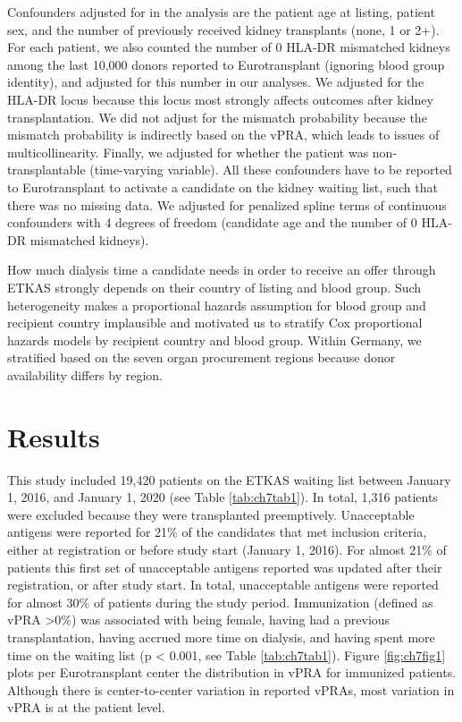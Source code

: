 \documentclass[11pt,twoside,]{book}
\begin{document}
Confounders adjusted for in the analysis are the patient age at listing, patient
sex, and the number of previously received kidney transplants (none, 1 or 2+). For each
patient, we also counted the number of 0 HLA-DR mismatched kidneys among
the last 10,000 donors reported to Eurotransplant (ignoring blood group identity),
and adjusted for this number in our analyses. We adjusted for the HLA-DR locus
because this locus most strongly affects outcomes after kidney transplantation.
We did not adjust for the mismatch probability because the mismatch probability
is indirectly based on the vPRA, which leads to issues of multicollinearity.
Finally, we adjusted for whether the patient
was non-transplantable (time-varying variable). All these confounders have to be
reported to Eurotransplant to activate a candidate on the kidney waiting list, such
that there was no missing data. We adjusted for penalized spline terms of
continuous confounders with 4 degrees of freedom (candidate age and the number of 0
HLA-DR mismatched kidneys).

How much dialysis time a candidate needs in order to receive an offer
through ETKAS strongly depends on their country of listing and
blood group. Such heterogeneity makes a proportional hazards assumption for
blood group and recipient country implausible and motivated us to stratify Cox
proportional hazards models by recipient country and blood group. Within Germany, we
stratified based on the seven organ procurement regions because donor availability
differs by region.
\newpage

\section{Results}\label{results-2}

This study included 19,420 patients on the ETKAS waiting list between
January 1, 2016, and January 1, 2020 (see Table \ref{tab:ch7tab1}). In total,
1,316 patients were excluded because they were transplanted preemptively.
Unacceptable antigens were reported for 21\% of the candidates that met inclusion
criteria, either at registration or before study start (January 1, 2016). For almost
21\% of patients this first set of unacceptable antigens reported was updated after
their registration, or after study start. In total, unacceptable antigens were
reported for almost 30\% of patients during the study period. Immunization
(defined as vPRA \textgreater0\%) was associated with being female, having had a previous
transplantation, having accrued more time on dialysis, and having spent more time on
the waiting list (p \textless{} 0.001, see Table \ref{tab:ch7tab1}).
Figure \ref{fig:ch7fig1} plots per Eurotransplant center
the distribution in vPRA for immunized patients. Although there is
center-to-center variation in reported vPRAs, most variation in
vPRA is at the patient level.
\end{document}
